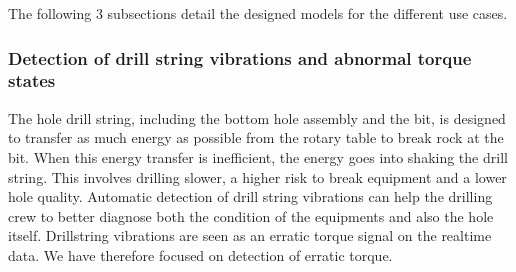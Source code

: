 %
%
%
%
%

The following 3 subsections detail the designed models for the different use cases.

\subsubsection{Detection of drill string vibrations and abnormal torque states}\label{SubSection:DetectionTorque}

The hole drill string, including the bottom hole assembly and the bit, is designed to transfer as much energy as possible from the rotary table to break rock at the bit.  When this energy transfer is inefficient, the energy goes into shaking the drill string.  This involves drilling slower, a higher risk to break equipment and a lower hole quality. Automatic detection of drill string vibrations can help the drilling crew to better diagnose both the condition of the equipments and also the hole itself. Drillstring vibrations are seen as an erratic torque signal on the realtime data.  We have therefore focused on detection of erratic torque.

